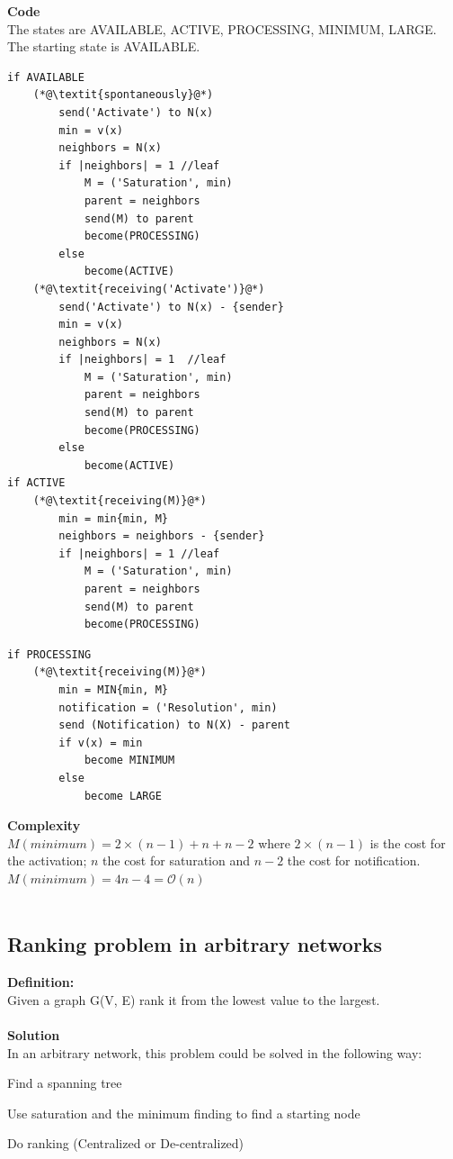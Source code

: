 \documentclass[paper=a4, fontsize=11pt]{scrartcl} %
\numberwithin{equation}{section} %
\numberwithin{figure}{section} %
\numberwithin{table}{section} %
\begin{document}
\textbf{Code} \\
The states are AVAILABLE, ACTIVE, PROCESSING, MINIMUM, LARGE. The starting state is AVAILABLE.
\begin{lstlisting}
if AVAILABLE
	(*@\textit{spontaneously}@*)
		send('Activate') to N(x)
		min = v(x)
		neighbors = N(x)
		if |neighbors| = 1 //leaf
			M = ('Saturation', min)
			parent = neighbors
			send(M) to parent
			become(PROCESSING)
		else
			become(ACTIVE)
	(*@\textit{receiving('Activate')}@*)
		send('Activate') to N(x) - {sender}
		min = v(x)
		neighbors = N(x)
		if |neighbors| = 1	//leaf
			M = ('Saturation', min)
			parent = neighbors
			send(M) to parent
			become(PROCESSING)
		else
			become(ACTIVE)
if ACTIVE
	(*@\textit{receiving(M)}@*)
		min = min{min, M}
		neighbors = neighbors - {sender}
		if |neighbors| = 1 //leaf
			M = ('Saturation', min)
			parent = neighbors	
			send(M) to parent
			become(PROCESSING)
\end{lstlisting}
\newpage
\begin{lstlisting}			
if PROCESSING
	(*@\textit{receiving(M)}@*)
		min = MIN{min, M}
		notification = ('Resolution', min)
		send (Notification) to N(X) - parent
		if v(x) = min
			become MINIMUM
		else
			become LARGE									
\end{lstlisting}
\textbf{Complexity} \\
$M(minimum) = 2\times(n-1) + n + n - 2$ where $2\times(n-1)$ is the cost for the activation; $n$ the cost for saturation and $n - 2$ the cost for notification.$M(minimum) = 4n - 4 = \mathcal{O}(n)$
\\ ~ \\
\subsection*{Ranking problem in arbitrary networks}
\textbf{Definition:} \\Given a graph G(V, E) rank it from the lowest value to the largest.\\ ~ \\
\textbf{Solution}\\In an arbitrary network, this problem could be solved in the following way:
\begin{compactitem}
\item Find a spanning tree
\item Use saturation and the minimum finding to find a starting node
\item Do ranking (Centralized or De-centralized)
\end{compactitem}
\end{document}
